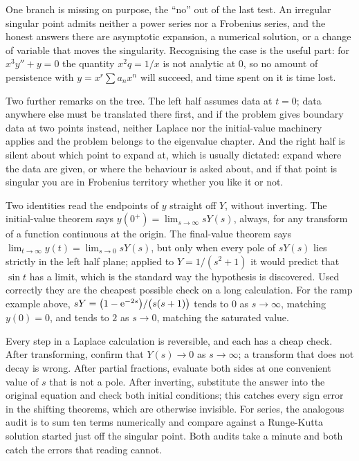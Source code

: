One branch is missing on purpose, the ``no'' out of the last test. An irregular singular point admits neither a power series nor a Frobenius series, and the honest answers there are asymptotic expansion, a numerical solution, or a change of variable that moves the singularity. Recognising the case is the useful part: for $x^{3}y''+y=0$ the quantity $x^{2}q=1/x$ is not analytic at $0$, so no amount of persistence with $y=x^{r}\sum a_nx^{n}$ will succeed, and time spent on it is time lost.

Two further remarks on the tree. The left half assumes data at $t=0$; data anywhere else must be translated there first, and if the problem gives boundary data at two points instead, neither Laplace nor the initial-value machinery applies and the problem belongs to the eigenvalue chapter. And the right half is silent about which point to expand at, which is usually dictated: expand where the data are given, or where the behaviour is asked about, and if that point is singular you are in Frobenius territory whether you like it or not.

\begin{keynote}
Two identities read the endpoints of $y$ straight off $Y$, without inverting. The initial-value theorem says $y(0^{+})=\lim_{s\to\infty}sY(s)$, always, for any transform of a function continuous at the origin. The final-value theorem says $\lim_{t\to\infty}y(t)=\lim_{s\to0}sY(s)$, but only when every pole of $sY(s)$ lies strictly in the left half plane; applied to $Y=1/(s^{2}+1)$ it would predict that $\sin t$ has a limit, which is the standard way the hypothesis is discovered. Used correctly they are the cheapest possible check on a long calculation. For the ramp example above, $sY=\bigl(1-\mathrm{e}^{-2s}\bigr)/\bigl(s(s+1)\bigr)$ tends to $0$ as $s\to\infty$, matching $y(0)=0$, and tends to $2$ as $s\to0$, matching the saturated value.
\end{keynote}

\begin{keynote}
Every step in a Laplace calculation is reversible, and each has a cheap check. After transforming, confirm that $Y(s)\to0$ as $s\to\infty$; a transform that does not decay is wrong. After partial fractions, evaluate both sides at one convenient value of $s$ that is not a pole. After inverting, substitute the answer into the original equation and check both initial conditions; this catches every sign error in the shifting theorems, which are otherwise invisible. For series, the analogous audit is to sum ten terms numerically and compare against a Runge-Kutta solution started just off the singular point. Both audits take a minute and both catch the errors that reading cannot.
\end{keynote}

